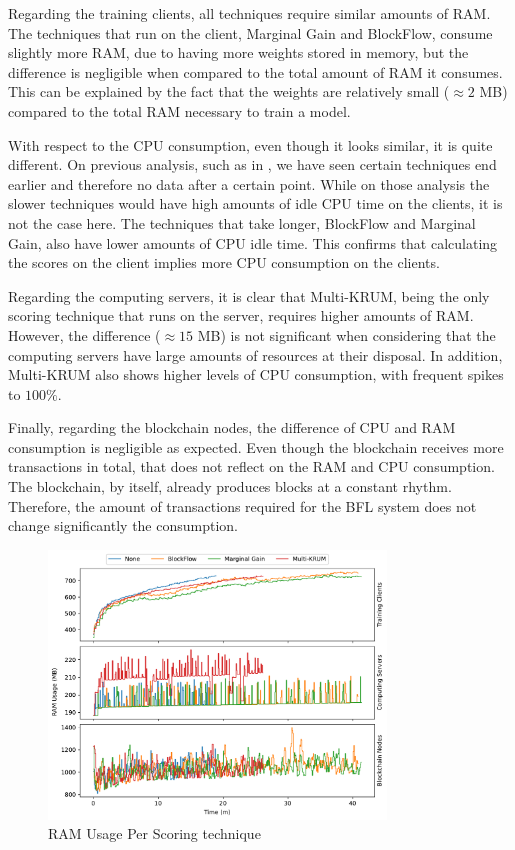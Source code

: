 Regarding the training clients, all techniques require similar amounts of RAM. The techniques that run on the client, Marginal Gain and BlockFlow, consume slightly more RAM, due to having more weights stored in memory, but the difference is negligible when compared to the total amount of RAM it consumes. This can be explained by the fact that the weights are relatively small ($\approx 2$ MB) compared to the total RAM necessary to train a model.

With respect to the CPU consumption, even though it looks similar, it is quite different. On previous analysis, such as in , we have seen certain techniques end earlier and therefore no data after a certain point. While on those analysis the slower techniques would have high amounts of idle CPU time on the clients, it is not the case here. The techniques that take longer, BlockFlow and Marginal Gain, also have lower amounts of CPU idle time. This confirms that calculating the scores on the client implies more CPU consumption on the clients.

Regarding the computing servers, it is clear that Multi-KRUM, being the only scoring technique that runs on the server, requires higher amounts of RAM. However, the difference ($\approx 15$ MB) is not significant when considering that the computing servers have large amounts of resources at their disposal. In addition, Multi-KRUM also shows higher levels of CPU consumption, with frequent spikes to $100\%$.

Finally, regarding the blockchain nodes, the difference of CPU and RAM consumption is negligible as expected. Even though the blockchain receives more transactions in total, that does not reflect on the RAM and CPU consumption. The blockchain, by itself, already produces blocks at a constant rhythm. Therefore, the amount of transactions required for the BFL system does not change significantly the consumption.

\begin{figure}[!hpt]
    \centering
    \centering
    \includegraphics[width=0.8\textwidth]{graphics/04_scoring_ram.pdf}
    \caption{RAM Usage Per Scoring technique}
    \label{fig:ram_scoring}
\end{figure}

